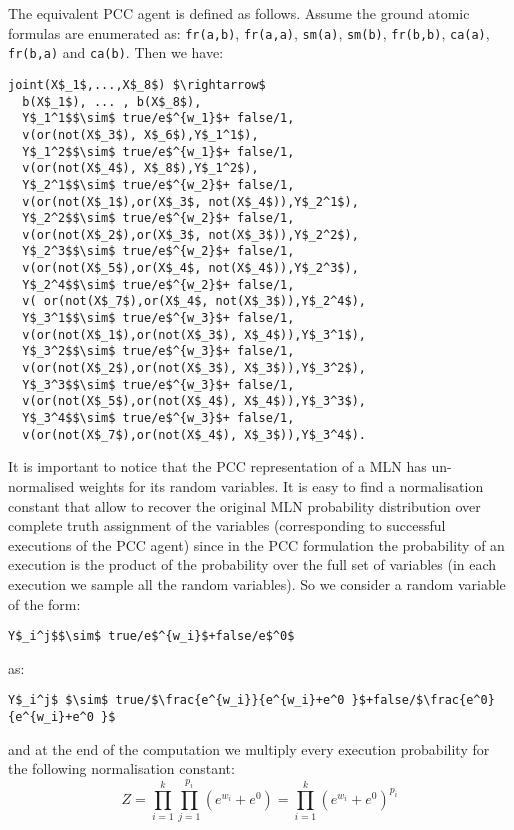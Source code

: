 \begin{example}
The equivalent PCC agent is defined as follows. Assume the ground atomic formulas are enumerated as:
\lstinline|fr(a,b)|,
\lstinline|fr(a,a)|,
\lstinline|sm(a)|,
\lstinline|sm(b)|,
\lstinline|fr(b,b)|,
\lstinline|ca(a)|,
\lstinline|fr(b,a)| and
\lstinline|ca(b)|. Then we have:
\begin{lstlisting}[mathescape=true]
joint(X$_1$,...,X$_8$) $\rightarrow$ 
  b(X$_1$), ... , b(X$_8$),
  Y$_1^1$$\sim$ true/e$^{w_1}$+ false/1, 
  v(or(not(X$_3$), X$_6$),Y$_1^1$),
  Y$_1^2$$\sim$ true/e$^{w_1}$+ false/1, 
  v(or(not(X$_4$), X$_8$),Y$_1^2$),	
  Y$_2^1$$\sim$ true/e$^{w_2}$+ false/1,
  v(or(not(X$_1$),or(X$_3$, not(X$_4$)),Y$_2^1$),
  Y$_2^2$$\sim$ true/e$^{w_2}$+ false/1,
  v(or(not(X$_2$),or(X$_3$, not(X$_3$)),Y$_2^2$),
  Y$_2^3$$\sim$ true/e$^{w_2}$+ false/1,
  v(or(not(X$_5$),or(X$_4$, not(X$_4$)),Y$_2^3$),
  Y$_2^4$$\sim$ true/e$^{w_2}$+ false/1,
  v( or(not(X$_7$),or(X$_4$, not(X$_3$)),Y$_2^4$),
  Y$_3^1$$\sim$ true/e$^{w_3}$+ false/1,
  v(or(not(X$_1$),or(not(X$_3$), X$_4$)),Y$_3^1$),
  Y$_3^2$$\sim$ true/e$^{w_3}$+ false/1,
  v(or(not(X$_2$),or(not(X$_3$), X$_3$)),Y$_3^2$),
  Y$_3^3$$\sim$ true/e$^{w_3}$+ false/1,
  v(or(not(X$_5$),or(not(X$_4$), X$_4$)),Y$_3^3$),	
  Y$_3^4$$\sim$ true/e$^{w_3}$+ false/1, 
  v(or(not(X$_7$),or(not(X$_4$), X$_3$)),Y$_3^4$).
\end{lstlisting}
\end{example}


It is important to notice that the PCC representation of a MLN has un-normalised weights for its random variables. It is easy to find a normalisation constant that allow to recover the original MLN probability distribution over complete truth assignment of the variables (corresponding to successful executions of the PCC agent) since in the PCC formulation the probability of an execution is the product of the probability over the full set of variables (in each execution we sample all the random variables). So we consider a random variable of the form:
\begin{lstlisting}[mathescape=true]
Y$_i^j$$\sim$ true/e$^{w_i}$+false/e$^0$
\end{lstlisting}
as:
\begin{lstlisting}[mathescape=true]
Y$_i^j$ $\sim$ true/$\frac{e^{w_i}}{e^{w_i}+e^0 }$+false/$\frac{e^0}{e^{w_i}+e^0 }$
\end{lstlisting}
 and at the end of the computation we multiply every execution probability for the following normalisation constant:
 $$Z=\prod_{i=1}^k \prod_{j=1}^{p_i} (e^{w_i} +e^0)=\prod_{i=1}^k (e^{w_i} +e^0)^{p_i}$$






